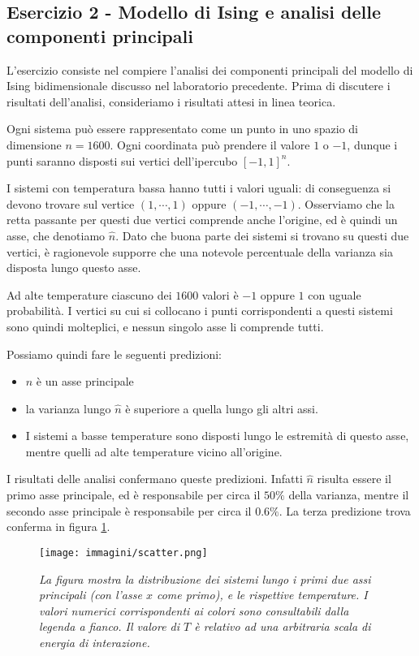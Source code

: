 \documentclass{article}
\begin{document}
\subsection*{Esercizio 2 - Modello di Ising e analisi delle componenti principali}
L'esercizio consiste nel compiere l'analisi dei componenti principali del modello di Ising bidimensionale discusso nel laboratorio precedente.
Prima di discutere i risultati dell'analisi, consideriamo i risultati attesi in linea teorica.

Ogni sistema può essere rappresentato come un punto in uno spazio di dimensione $n = 1600$.
Ogni coordinata può prendere il valore $1$ o $-1$, dunque i punti saranno disposti sui vertici dell'ipercubo $[-1,1]^n$.

I sistemi con temperatura bassa hanno tutti i valori uguali: di conseguenza si devono trovare sul vertice $(1,\cdots, 1)$ oppure $(-1,\cdots, -1)$.
Osserviamo che la retta passante per questi due vertici comprende anche l'origine, ed è quindi un asse, che denotiamo $\hat{n}$.
Dato che buona parte dei sistemi si trovano su questi due vertici, è ragionevole supporre che una notevole percentuale della varianza sia disposta lungo questo asse.

Ad alte temperature ciascuno dei $1600$ valori è $-1$ oppure $1$ con uguale probabilità.
I vertici su cui si collocano i punti corrispondenti a questi sistemi sono quindi molteplici, e nessun singolo asse li comprende tutti.
 

Possiamo quindi fare le seguenti predizioni:
\begin{itemize}
    \item $\hat{n}$ è un asse principale
    \item la varianza lungo $\hat{n}$ è superiore a quella lungo gli altri assi.
    \item I sistemi a basse temperature sono disposti lungo le estremità di questo asse,
    mentre quelli ad alte temperature vicino all'origine.
\end{itemize}

I risultati delle analisi confermano queste predizioni. Infatti $\hat{n}$ risulta essere il primo asse principale, ed è responsabile per circa il $50\%$ della varianza, mentre il secondo asse principale è responsabile per circa il $ 0.6\%$.
La terza predizione trova conferma in figura \ref{fig:scatter}.


\begin{figure}[htpb]
    \centering
    \texttt{[image: immagini/scatter.png]}
    \caption{\emph{La figura mostra la distribuzione dei sistemi lungo i primi due assi principali (con l'asse $x$ come primo), e le rispettive temperature. I valori numerici corrispondenti ai colori sono consultabili dalla legenda a fianco. Il valore di $T$ è relativo ad una arbitraria scala di energia di interazione.}}
    \label{fig:scatter}
\end{figure}
\end{document}
